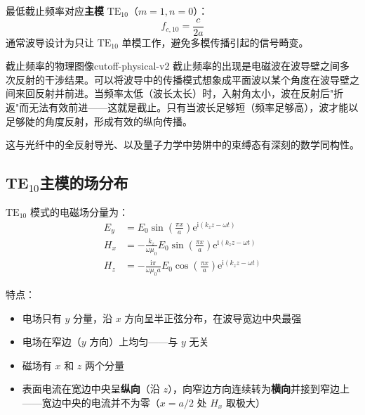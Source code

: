 \documentclass[11pt,a4paper,openany,oneside]{book}
\newcommand{\ii}{\mathrm{i}}
\newcommand{\ee}{\mathrm{e}}
\newcommand{\muz}{\mu_0}
\begin{document}
最低截止频率对应\textbf{主模} $\text{TE}_{10}$（$m=1, n=0$）：
\[
f_{c,10} = \frac{c}{2a}
\]
通常波导设计为只让 $\text{TE}_{10}$ 单模工作，避免多模传播引起的信号畸变。

\begin{insight}{截止频率的物理图像}{cutoff-physical-v2}
截止频率的出现是电磁波在波导壁之间多次反射的干涉结果。可以将波导中的传播模式想象成平面波以某个角度在波导壁之间来回反射并前进。当频率太低（波长太长）时，入射角太小，波在反射后"折返"而无法有效前进——这就是截止。只有当波长足够短（频率足够高），波才能以足够陡的角度反射，形成有效的纵向传播。

这与光纤中的全反射导光、以及量子力学中势阱中的束缚态有深刻的数学同构性。
\end{insight}

\subsection{TE\texorpdfstring{$_{10}$}{10}主模的场分布}

$\text{TE}_{10}$ 模式的电磁场分量为：
\begin{align}
E_y &= E_0 \sin\left(\frac{\pi x}{a}\right) \ee^{\ii(k_z z - \omega t)} \\
H_x &= -\frac{k_z}{\omega\muz} E_0 \sin\left(\frac{\pi x}{a}\right) \ee^{\ii(k_z z - \omega t)} \\
H_z &= -\frac{\ii\pi}{\omega\muz a} E_0 \cos\left(\frac{\pi x}{a}\right) \ee^{\ii(k_z z - \omega t)}
\end{align}

特点：
\begin{itemize}
\item 电场只有 $y$ 分量，沿 $x$ 方向呈半正弦分布，在波导宽边中央最强
\item 电场在窄边（$y$ 方向）上均匀——与 $y$ 无关
\item 磁场有 $x$ 和 $z$ 两个分量
\item 表面电流在宽边中央呈\textbf{纵向}（沿 $z$），向窄边方向连续转为\textbf{横向}并接到窄边上——宽边中央的电流并不为零（$x=a/2$ 处 $H_x$ 取极大）
\end{itemize}
\end{document}
